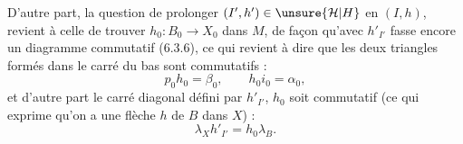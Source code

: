 
D'autre part, la question de prolonger
$(I',h')\in\unsure{\mathcal H|H}$ en $(I,h)$, revient à celle
de trouver $h_0\colon B_0\longrightarrow X_0$ dans $M$,
de façon qu'avec $h'_{I'}$  fasse encore
un diagramme commutatif  (6.3.6),
ce qui revient à dire que  les deux
triangles formés dans le carré du
bas sont commutatifs :
\[
 p_0 h_0=\beta_0,\qquad h_0 i_0=\alpha_0,\tag*{(6.3.7)}
\]
et d'autre part le carré diagonal défini
par $h'_{I'}$, $h_0$ soit commutatif (ce qui
exprime qu'on a une flèche $h$ de
$B$ dans $X$) :
\[
 \lambda_X h'_{I'}=h_0\lambda_B.\tag*{(6.3.8)}
\]

